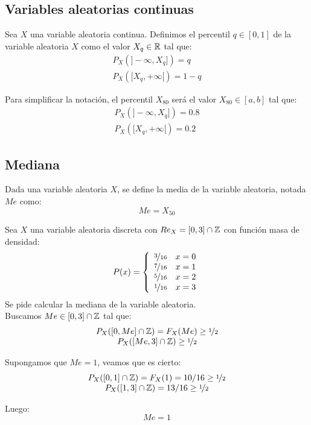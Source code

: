 \subsection{Variables aleatorias continuas}
\begin{definicion}
    Sea $X$ una variable aleatoria continua. Definimos el percentil $q \in [0,1]$ de la variable
    aleatoria $X$ como el valor $X_q \in \mathbb{R}$ tal que:
    $$\begin{array}{c}
        P_X(]-\infty, X_q]) = q \\
        P_X([X_q, +\infty[) = 1-q
    \end{array}$$
\end{definicion}
\begin{notacion}
    Para simplificar la notación, el percentil $X_{80}$ será el valor $X_{80} \in [a,b]$ tal que:
    $$\begin{array}{c}
        P_X(]-\infty, X_q]) = 0.8 \\
        P_X([X_q, +\infty[) = 0.2
    \end{array}$$
\end{notacion}

\subsection{Mediana}
\begin{definicion}
    Dada una variable aleatoria $X$, se define la media de la variable aleatoria, notada $Me$ como:
    $$Me = X_{50}$$
\end{definicion}

\begin{ejemplo}
    Sea $X$ una variable aleatoria discreta con $Re_X = [0,3] \cap \mathbb Z$ con función masa de densidad:
    $$P(x) = \left\{ \begin{array}{cc}
        \nicefrac{3}{16} & x = 0 \\
        \nicefrac{7}{16} & x = 1 \\
        \nicefrac{5}{16} & x = 2 \\
        \nicefrac{1}{16} & x = 3
      \end{array} \right.$$
    Se pide calcular la mediana de la variable aleatoria.\\
    
    
    Buscamos $Me \in [0,3] \cap \mathbb Z$ tal que:
    $$\begin{array}{c}
        P_X([0, Me] \cap \mathbb Z) = F_X(Me) \geq \nicefrac{1}{2} \\
        P_X([Me, 3] \cap \mathbb Z) \geq \nicefrac{1}{2}
      \end{array}$$
    
    
    Supongamos que $Me=1$, veamos que es cierto:
    $$\begin{array}{c}
        P_X([0, 1] \cap \mathbb Z) = F_X(1) = 10/16 \geq \nicefrac{1}{2} \\
        P_X([1, 3] \cap \mathbb Z) = 13/16 \geq \nicefrac{1}{2}
      \end{array}$$
    
    Luego:
    $$Me = 1$$
\end{ejemplo}


